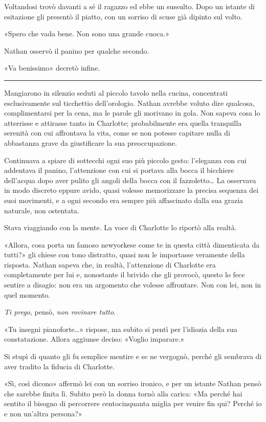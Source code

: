 \documentclass[a4paper,oneside,10pt]{memoir}
\begin{document}
Voltandosi trovò davanti a sé il ragazzo ed ebbe un sussulto. Dopo un istante di esitazione gli presentò il piatto,
con un sorriso di scuse già dipinto sul volto.

«Spero che vada bene. Non sono una grande cuoca.»

Nathan osservò il panino per qualche secondo.

«Va benissimo» decretò infine.

\plainbreak{1}

Mangiarono in silenzio seduti al piccolo tavolo nella cucina, concentrati esclusivamente sul ticchettio dell'orologio.
Nathan avrebbe voluto dire qualcosa, complimentarsi per la cena, ma le parole gli morivano in gola. Non sapeva cosa lo
atterrisse e attirasse tanto in Charlotte; probabilmente era quella tranquilla serenità con cui affrontava la vita,
come se non potesse capitare nulla di abbastanza grave da giustificare la sua preoccupazione.

Continuava a spiare di sottecchi ogni suo più piccolo gesto: l'eleganza con cui addentava il panino, l'attenzione con
cui si portava alla bocca il bicchiere dell'acqua dopo aver pulito gli angoli della bocca con il fazzoletto\dots{} La
osservava in modo discreto eppure avido, quasi volesse memorizzare la precisa sequenza dei suoi movimenti, e a ogni
secondo era sempre più affascinato dalla sua grazia naturale, non ostentata.

Stava viaggiando con la mente. La voce di Charlotte lo riportò alla realtà.

«Allora, cosa porta un famoso newyorkese come te in questa città dimenticata da tutti?» gli chiese con tono
distratto, quasi non le importasse veramente della risposta. Nathan sapeva che, in realtà, l'attenzione di Charlotte
era completamente per lui e, nonostante il brivido che gli provocò, questo lo fece sentire a disagio: non era un
argomento che volesse affrontare. Non con lei, non in quel momento.

\emph{Ti prego}, pensò, \emph{non rovinare tutto}.

«Tu insegni pianoforte\dots{}» rispose, ma subito si pentì per l'idiozia della sua constatazione. Allora aggiunse
deciso: «Voglio imparare.»

Si stupì di quanto gli fu semplice mentire e se ne vergognò, perché gli sembrava di aver tradito la fiducia di
Charlotte.

«Sì, così dicono» affermò lei con un sorriso ironico, e per un istante Nathan pensò che sarebbe finita lì. Subito
però la donna tornò alla carica: «Ma perché hai sentito il bisogno di percorrere centocinquanta miglia per venire
fin qui? Perché io e non un'altra persona?»
\end{document}
